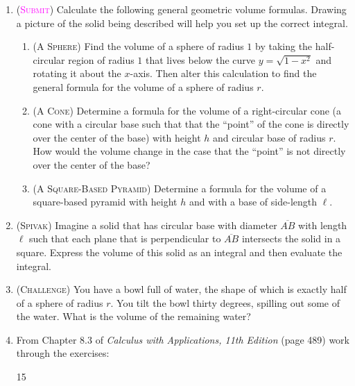\begin{enumerate}
    \item
        (\textsc{\textcolor{magenta}{Submit}})
        Calculate the following general geometric volume formulas.
        Drawing a picture of the solid being described
        will help you set up the correct integral.
        \begin{enumerate}
            \item (\textsc{A Sphere})
                Find the volume of a sphere of radius $1$
                by taking the half-circular region of radius $1$
                that lives below the curve $y=\sqrt{1-x^2}$
                and rotating it about the $x$-axis.
                Then alter this calculation to find
                the general formula for the volume of a sphere of radius $r$.
            \item (\textsc{A Cone})
                Determine a formula for the volume of a right-circular cone
                (a cone with a circular base such that that
                the ``point'' of the cone is directly over the center of the base)
                with height $h$ and circular base of radius $r$.
                How would the volume change in the case
                that the ``point'' is not directly over the center of the base?
            \item (\textsc{A Square-Based Pyramid})
                Determine a formula for the volume of a square-based pyramid
                with height $h$ and with a base of side-length $\ell$.
        \end{enumerate}

    \item 
        (\textsc{Spivak})
        Imagine a solid that has circular base 
        with diameter $\overline{AB}$ with length $\ell$ such that each plane 
        that is perpendicular to $\overline{AB}$ intersects the solid in a square. 
        Express the volume of this solid as an integral 
        and then evaluate the integral.

    \item 
        (\textsc{Challenge})
        You have a bowl full of water, the shape of which 
        is exactly half of a sphere of radius $r$.
        You tilt the bowl thirty degrees, spilling out some of the water.
        What is the volume of the remaining water?

    \item %
        From Chapter 8.3 of \emph{Calculus with Applications, 11th Edition}
        (page 489) work through the exercises:
        \begin{center}
            15
        \end{center}


\end{enumerate}

